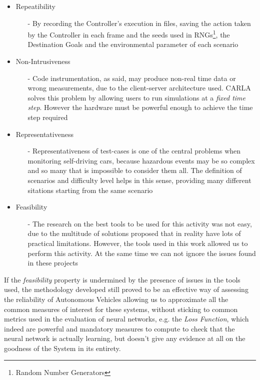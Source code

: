 \begin{itemize}
	\item Repeatibility
	\begin{itemize}
		\item[-] By recording the Controller's execution in files, saving the action taken by the Controller in each frame and the seeds used in RNGs\footnote{Random Number Generators}, the Destination Goals and the environmental parameter of each scenario
	\end{itemize}
	\item Non-Intrusiveness
	\begin{itemize}
		\item[-] Code instrumentation, as said, may produce non-real time data or wrong measurements, due to the client-server architecture used. CARLA solves this problem by allowing users to run simulations at a \textsl{fixed time step}. However the hardware must be powerful enough to achieve the time step required
	\end{itemize}
	\item Representativeness
	\begin{itemize}
		\item[-] Representativeness of test-cases is one of the central problems when monitoring self-driving cars, because hazardous events may be so complex and so many that is impossible to consider them all. The definition of scenarios and difficulty level helps in this sense, providing many different sitations starting from the same scenario
	\end{itemize}
	\item Feasibility
	\begin{itemize}
		\item[-] The research on the best tools to be used for this activity was not easy, due to the multitude of solutions proposed that in reality have lots of practical limitations. However, the tools used in this work allowed us to perform this activity. At the same time we can not ignore the issues found in these projects
	\end{itemize}
\end{itemize}

If the \textsl{feasibility} property is undermined by the presence of issues in the tools used, the methodology developed still proved to be an effective way of assessing the reliability of Autonomous Vehicles allowing us to approximate all the common measures of interest for these systems, without sticking to common metrics used in the evaluation of neural networks, e.g. the \textsl{Loss Function}, which indeed are powerful and mandatory measures to compute to check that the neural network is actually learning, but doesn't give any evidence at all on the goodness of the System in its entirety.

